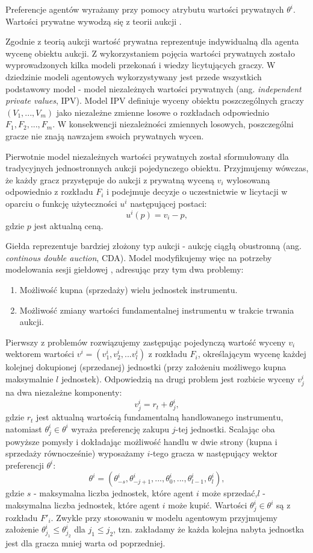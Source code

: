 {Preferencje agentów wyrażamy przy pomocy atrybutu wartości prywatnych $\theta^i$. Wartości prywatne wywodzą się z teorii aukcji \cite{auction_theory}. 

Zgodnie z teorią aukcji wartość prywatna reprezentuje indywidualną dla agenta wycenę obiektu aukcji. Z wykorzystaniem pojęcia wartości prywatnych zostało wyprowadzonych kilka modeli przekonań i wiedzy licytujących graczy. W dziedzinie modeli agentowych wykorzystywany jest przede wszystkich podstawowy model - model niezależnych wartości prywatnych (ang. \textit{independent private values}, IPV). 
Model IPV definiuje wyceny obiektu poszczególnych graczy $(V_1,..., V_m)$ jako niezależne zmienne losowe o rozkładach odpowiednio $F_1, F_2, ..., F_m$. W konsekwencji niezależności zmiennych losowych, poszczególni gracze nie znają nawzajem swoich prywatnych wycen. 

Pierwotnie model niezależnych wartości prywatnych został sformułowany dla tradycyjnych jednostronnych aukcji pojedynczego obiektu. Przyjmujemy wówczas, że każdy gracz przystępuje do aukcji z prywatną wyceną $v_i$ wylosowaną odpowiednio z rozkładu $F_i$ i podejmuje decyzje o uczestnictwie w licytacji w oparciu o funkcję użyteczności $u^i$ następującej postaci:
$$u^i(p) = v_i - p, $$
gdzie $p$ jest aktualną ceną. 

Giełda reprezentuje bardziej złożony typ aukcji - aukcję ciągłą obustronną (ang. \textit{continous double auction}, CDA). Model modyfikujemy więc na potrzeby modelowania sesji giełdowej \cite{lobspoofing}, adresując przy tym dwa problemy: 
\begin{enumerate}
\item Możliwość kupna (sprzedaży) wielu jednostek instrumentu.
\item Możliwość zmiany wartości fundamentalnej instrumentu w trakcie trwania aukcji. 
\end{enumerate}
Pierwszy z problemów rozwiązujemy zastępując pojedynczą wartość wyceny $v_i$ wektorem wartości $v^i = (v^i_1, v^i_2, ...v^i_l)$ z rozkładu $F_i$, określającym wycenę każdej kolejnej dokupionej (sprzedanej) jednostki (przy założeniu możliwego kupna maksymalnie $l$ jednostek). Odpowiedzią na drugi problem jest rozbicie wyceny $v^i_j$ na dwa niezależne komponenty: 
$$v^i_j = r_t + \theta^i_j, $$
gdzie $r_t$ jest aktualną wartością fundamentalną handlowanego instrumentu, natomiast $\theta^i_j \in \theta^i$ wyraża preferencję zakupu $j$-tej jednostki. 
Scalając oba powyższe pomysły i dokładając możliwość handlu w dwie strony (kupna i sprzedaży równocześnie) wyposażamy $i$-tego gracza w następujący wektor preferencji $\theta^i$: 
$$\theta^i = (\theta^i_{-s}, \theta^i_{-j+1}, ...,\theta^i_{0}, ...,\theta^i_{l-1}, \theta^i_{l}),$$
gdzie $s$ - maksymalna liczba jednostek, które agent $i$ może sprzedać,$l$ - maksymalna liczba jednostek, które agent $i$ może kupić. Wartości $\theta^i_j\in \theta^i$ są z rozkładu $F'_i$. Zwykle przy stosowaniu w modelu agentowym przyjmujemy założenie $\theta^i_{j_1} \leq \theta^i_{j_2}$ dla $j_1 \leq j_2$, tzn. zakładamy że każda kolejna nabyta jednostka jest dla gracza mniej warta od poprzedniej. 

}
